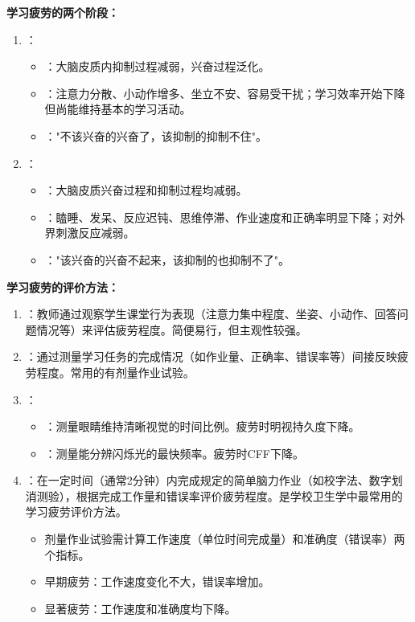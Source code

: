\begin{keybox}
\textbf{学习疲劳的两个阶段：}

\begin{enumerate}[leftmargin=*]
    \item {}：
    \begin{itemize}
        \item {}：大脑皮质内抑制过程减弱，兴奋过程泛化。
        \item {}：注意力分散、小动作增多、坐立不安、容易受干扰；学习效率开始下降但尚能维持基本的学习活动。
        \item {}："不该兴奋的兴奋了，该抑制的抑制不住"。
    \end{itemize}
    \item {}：
    \begin{itemize}
        \item {}：大脑皮质兴奋过程和抑制过程均减弱。
        \item {}：瞌睡、发呆、反应迟钝、思维停滞、作业速度和正确率明显下降；对外界刺激反应减弱。
        \item {}："该兴奋的兴奋不起来，该抑制的也抑制不了"。
    \end{itemize}
\end{enumerate}

\textbf{学习疲劳的评价方法：}

\begin{enumerate}[leftmargin=*]
    \item {}：教师通过观察学生课堂行为表现（注意力集中程度、坐姿、小动作、回答问题情况等）来评估疲劳程度。简便易行，但主观性较强。
    \item {}：通过测量学习任务的完成情况（如作业量、正确率、错误率等）间接反映疲劳程度。常用的有剂量作业试验。
    \item {}：
    \begin{itemize}
        \item {}：测量眼睛维持清晰视觉的时间比例。疲劳时明视持久度下降。
        \item {}：测量能分辨闪烁光的最快频率。疲劳时CFF下降。
    \end{itemize}
    \item {}：在一定时间（通常2分钟）内完成规定的简单脑力作业（如校字法、数字划消测验），根据完成工作量和错误率评价疲劳程度。是学校卫生学中最常用的学习疲劳评价方法。
    \begin{itemize}
        \item 剂量作业试验需计算工作速度（单位时间完成量）和准确度（错误率）两个指标。
        \item 早期疲劳：工作速度变化不大，错误率增加。
        \item 显著疲劳：工作速度和准确度均下降。
    \end{itemize}
\end{enumerate}
\end{keybox}

